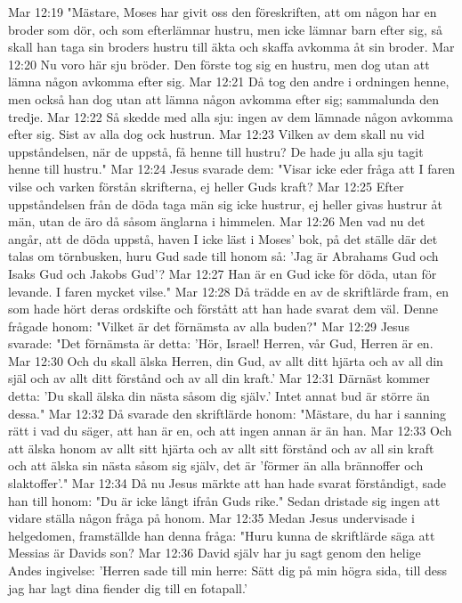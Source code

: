 Mar 12:19  "Mästare, Moses har givit oss den föreskriften, att om någon har en broder som dör, och som efterlämnar hustru, men icke lämnar barn efter sig, så skall han taga sin broders hustru till äkta och skaffa avkomma åt sin broder.
Mar 12:20  Nu voro här sju bröder. Den förste tog sig en hustru, men dog utan att lämna någon avkomma efter sig.
Mar 12:21  Då tog den andre i ordningen henne, men också han dog utan att lämna någon avkomma efter sig; sammalunda den tredje.
Mar 12:22  Så skedde med alla sju: ingen av dem lämnade någon avkomma efter sig. Sist av alla dog ock hustrun.
Mar 12:23  Vilken av dem skall nu vid uppståndelsen, när de uppstå, få henne till hustru? De hade ju alla sju tagit henne till hustru."
Mar 12:24  Jesus svarade dem: "Visar icke eder fråga att I faren vilse och varken förstån skrifterna, ej heller Guds kraft?
Mar 12:25  Efter uppståndelsen från de döda taga män sig icke hustrur, ej heller givas hustrur åt män, utan de äro då såsom änglarna i himmelen.
Mar 12:26  Men vad nu det angår, att de döda uppstå, haven I icke läst i Moses' bok, på det ställe där det talas om törnbusken, huru Gud sade till honom så: 'Jag är Abrahams Gud och Isaks Gud och Jakobs Gud'?
Mar 12:27  Han är en Gud icke för döda, utan för levande. I faren mycket vilse."
Mar 12:28  Då trädde en av de skriftlärde fram, en som hade hört deras ordskifte och förstått att han hade svarat dem väl. Denne frågade honom: "Vilket är det förnämsta av alla buden?"
Mar 12:29  Jesus svarade: "Det förnämsta är detta: 'Hör, Israel! Herren, vår Gud, Herren är en.
Mar 12:30  Och du skall älska Herren, din Gud, av allt ditt hjärta och av all din själ och av allt ditt förstånd och av all din kraft.'
Mar 12:31  Därnäst kommer detta: 'Du skall älska din nästa såsom dig själv.' Intet annat bud är större än dessa."
Mar 12:32  Då svarade den skriftlärde honom: "Mästare, du har i sanning rätt i vad du säger, att han är en, och att ingen annan är än han.
Mar 12:33  Och att älska honom av allt sitt hjärta och av allt sitt förstånd och av all sin kraft och att älska sin nästa såsom sig själv, det är 'förmer än alla brännoffer och slaktoffer'."
Mar 12:34  Då nu Jesus märkte att han hade svarat förståndigt, sade han till honom: "Du är icke långt ifrån Guds rike." Sedan dristade sig ingen att vidare ställa någon fråga på honom.
Mar 12:35  Medan Jesus undervisade i helgedomen, framställde han denna fråga: "Huru kunna de skriftlärde säga att Messias är Davids son?
Mar 12:36  David själv har ju sagt genom den helige Andes ingivelse: 'Herren sade till min herre: Sätt dig på min högra sida, till dess jag har lagt dina fiender dig till en fotapall.'
